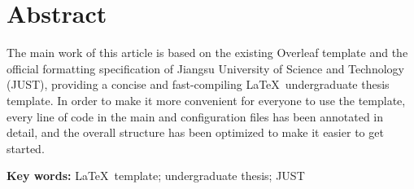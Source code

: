 \chapter*{\bfseries Abstract}

{\rmfamily\fontsize{12pt}{20pt}\selectfont
The main work of this article is based on the existing Overleaf template and the official formatting specification of Jiangsu University of Science and Technology (JUST), providing a concise and fast-compiling \LaTeX\ undergraduate thesis template. In order to make it more convenient for everyone to use the template, every line of code in the main and configuration files has been annotated in detail, and the overall structure has been optimized to make it easier to get started.
}

\par\vspace{\baselineskip}
\noindent
{\rmfamily\bfseries{}Key words: }{\rmfamily{}\LaTeX\ template; undergraduate thesis; JUST}

\clearpage
